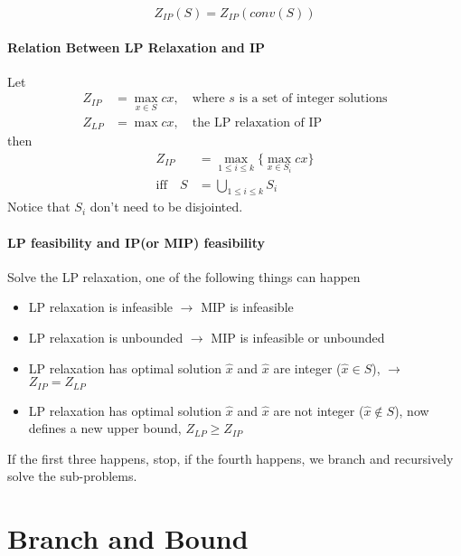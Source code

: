                 \begin{equation*}Z_{IP}(S) = Z_{IP}(conv(S))  \end{equation*}
        
            \paragraph{Relation Between LP Relaxation and IP}
                Let
                \begin{align*}
                    Z_{IP} &=\max_{x\in S} cx, \quad \text{where } s \text{ is a set of integer solutions} \\
                    Z_{LP} &=\max cx, \quad \text{the LP relaxation of IP}  
                \end{align*}
                then
                \begin{align*}
                    Z_{IP} &= \max_{1\le i \le k} \{\max_{x \in S_i} cx \} \\
                    \text{iff} \quad S&=\bigcup_{1\le i \le k} S_i 
                \end{align*}
                Notice that $S_i$ don\rq{}t need to be disjointed.
                
            \paragraph{LP feasibility and IP(or MIP) feasibility}
                Solve the LP relaxation, one of the following things can happen
                \begin{itemize}
                    \item LP relaxation is infeasible $\rightarrow$ MIP is infeasible
                    \item LP relaxation is unbounded $\rightarrow$ MIP is infeasible or unbounded
                    \item LP relaxation has optimal solution $\hat{x}$ and $\hat{x}$ are integer ($\hat{x} \in S$), $\rightarrow$ $Z_{IP} = Z_{LP}$
                    \item LP relaxation has optimal solution $\hat{x}$ and $\hat{x}$ are not integer ($\hat{x} \notin S$), now defines a new upper bound, $Z_{LP} \ge Z_{IP}$                    
                \end{itemize}
                If the first three happens, stop, if the fourth happens, we branch and recursively solve the sub-problems.

    \section{Branch and Bound}

